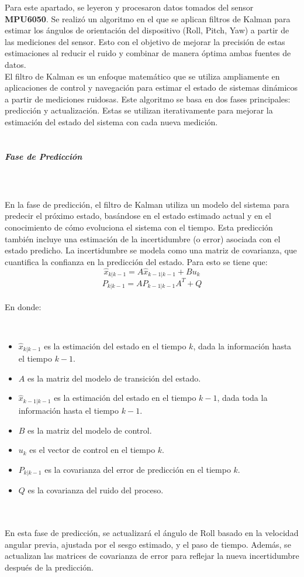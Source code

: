Para este apartado, se leyeron y procesaron datos tomados del sensor \textbf{MPU6050}. Se realizó un algoritmo en el que se aplican filtros de Kalman para estimar los ángulos de orientación del dispositivo (Roll, Pitch, Yaw) a partir de las mediciones del sensor. Esto con el objetivo de mejorar la precisión de estas estimaciones al reducir el ruido y combinar de manera óptima ambas fuentes de datos. \\ 

El filtro de Kalman es un enfoque matemático que se utiliza ampliamente en aplicaciones de control y navegación para estimar el estado de sistemas dinámicos a partir de mediciones ruidosas. Este algoritmo se basa en dos fases principales: predicción y actualización. Estas se utilizan iterativamente para mejorar la estimación del estado del sistema con cada nueva medición.
\\ \\
\subparagraph{\textbf{\large Fase de Predicción}} \\ \\

En la fase de predicción, el filtro de Kalman utiliza un modelo del sistema para predecir el próximo estado, basándose en el estado estimado actual y en el conocimiento de cómo evoluciona el sistema con el tiempo. Esta predicción también incluye una estimación de la incertidumbre (o error) asociada con el estado predicho. La incertidumbre se modela como una matriz de covarianza, que cuantifica la confianza en la predicción del estado. Para esto se tiene que: \\

\[
\hat{x}_{k|k-1} = A\hat{x}_{k-1|k-1} + B u_k
\]
\[
P_{k|k-1} = A P_{k-1|k-1} A^T + Q
\]
\\
En donde:

\\
\begin{itemize}
    \item $\hat{x}_{k|k-1}$ es la estimación del estado en el tiempo $k$, dada la información hasta el tiempo $k-1$.
    \item $A$ es la matriz del modelo de transición del estado.
    \item $\hat{x}_{k-1|k-1}$ es la estimación del estado en el tiempo $k-1$, dada toda la información hasta el tiempo $k-1$.
    \item $B$ es la matriz del modelo de control.
    \item $u_k$ es el vector de control en el tiempo $k$.
    \item $P_{k|k-1}$ es la covarianza del error de predicción en el tiempo $k$.
    \item $Q$ es la covarianza del ruido del proceso.
\end{itemize}
\\ \\
En esta fase de predicción, se actualizará el ángulo de Roll basado en la velocidad angular previa, ajustada por el sesgo estimado, y el paso de tiempo. Además, se actualizan las matrices de covarianza de error para reflejar la nueva incertidumbre después de la predicción.

